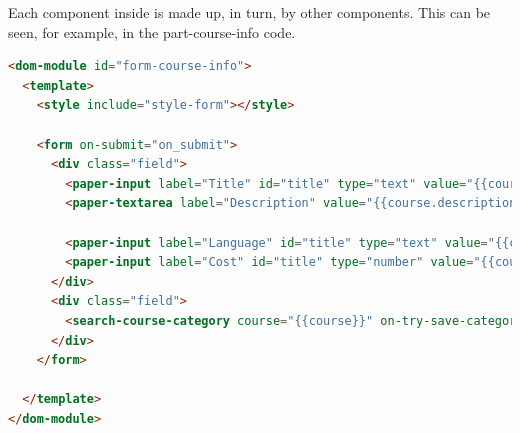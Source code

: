 Each component inside is made up, in turn, by other components. This can be seen, for example, in the part-course-info code.

\begin{lstlisting}[language=html]
<dom-module id="form-course-info">
  <template>
    <style include="style-form"></style>

    <form on-submit="on_submit">
      <div class="field">
        <paper-input label="Title" id="title" type="text" value="{{course.title}}"></paper-input>
        <paper-textarea label="Description" value="{{course.description}}"></paper-textarea>
      
        <paper-input label="Language" id="title" type="text" value="{{course.language}}"></paper-input>
        <paper-input label="Cost" id="title" type="number" value="{{course.cost}}"></paper-input>
      </div>
      <div class="field">
        <search-course-category course="{{course}}" on-try-save-categories="on_try_save_categories" on-try-delete-category="on_try_delete_category"></search-course-category>
      </div>
    </form>

  </template>
</dom-module>
\end{lstlisting}








